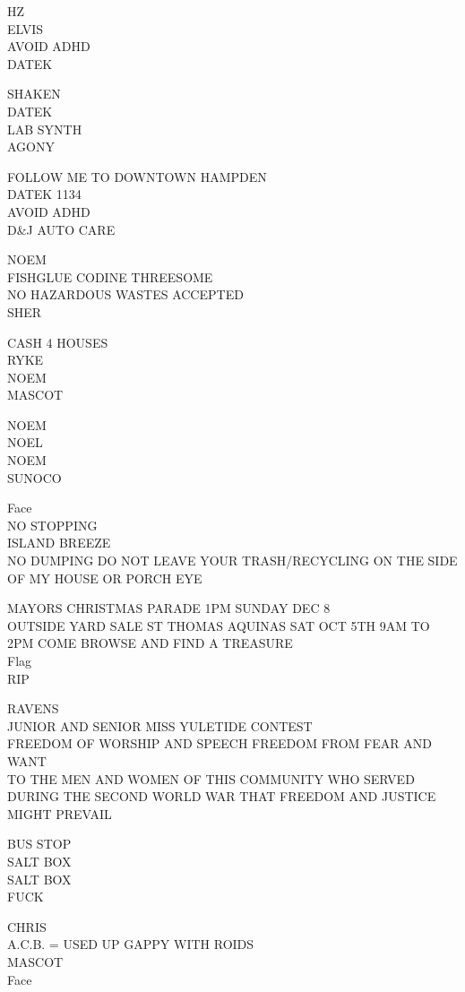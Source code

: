 \documentclass[10pt,letterpaper]{article}
\begin{document}
HZ\\
ELVIS\\
AVOID ADHD\\
DATEK

SHAKEN\\
DATEK\\
LAB SYNTH\\
AGONY

FOLLOW ME TO DOWNTOWN HAMPDEN\\
DATEK 1134\\
AVOID ADHD\\
D\&J AUTO CARE

NOEM\\
FISHGLUE CODINE THREESOME\\
NO HAZARDOUS WASTES ACCEPTED\\
SHER

CASH 4 HOUSES\\
RYKE\\
NOEM\\
MASCOT

NOEM\\
NOEL\\
NOEM\\
SUNOCO

Face\\
NO STOPPING\\
ISLAND BREEZE\\
NO DUMPING DO NOT LEAVE YOUR TRASH/RECYCLING ON THE SIDE OF MY HOUSE OR PORCH EYE

MAYORS CHRISTMAS PARADE 1PM SUNDAY DEC 8\\
OUTSIDE YARD SALE ST THOMAS AQUINAS SAT OCT 5TH 9AM TO 2PM COME BROWSE AND FIND A TREASURE\\
Flag\\
RIP

RAVENS\\
JUNIOR AND SENIOR MISS YULETIDE CONTEST\\
FREEDOM OF WORSHIP AND SPEECH FREEDOM FROM FEAR AND WANT\\
TO THE MEN AND WOMEN OF THIS COMMUNITY WHO SERVED DURING THE SECOND WORLD WAR THAT FREEDOM AND JUSTICE MIGHT PREVAIL

BUS STOP\\
SALT BOX\\
SALT BOX\\
FUCK

CHRIS\\
A.C.B. = USED UP GAPPY WITH ROIDS\\
MASCOT\\
Face
\end{document}

